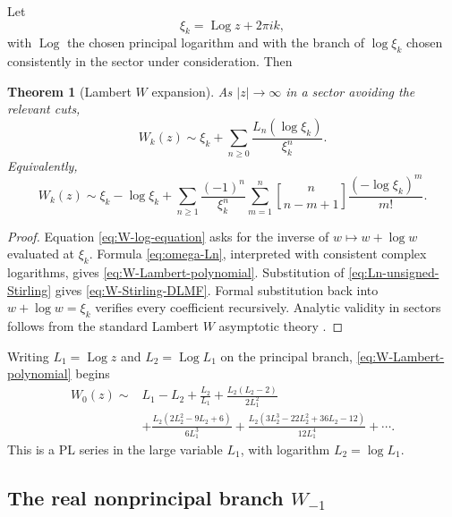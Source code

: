 \documentclass[11pt,oneside]{article}
\numberwithin{equation}{section}
\newtheorem{theorem}{Theorem}[section]
\theoremstyle{definition}
\newcommand{\as}{\sim}
\newcommand{\StirlingFirst}[2]{\genfrac{[}{]}{0pt}{}{#1}{#2}}
\newcommand{\Log}{\operatorname{Log}}
\begin{document}
Let
\begin{equation}\label{eq:xi-k}
  \xi_k=\Log z+2\pi i k,
\end{equation}
with \(\Log\) the chosen principal logarithm and with the branch of
\(\log\xi_k\) chosen consistently in the sector under consideration.  Then
\begin{theorem}[Lambert \(W\) expansion]\label{thm:W-expansion}
As \(|z|\to\infty\) in a sector avoiding the relevant cuts,
\begin{equation}\label{eq:W-Lambert-polynomial}
\boxed{
  W_k(z)\as \xi_k+
  \sum_{n\ge0}\frac{L_n(\log\xi_k)}{\xi_k^n}.
}
\end{equation}
Equivalently,
\begin{equation}\label{eq:W-Stirling-DLMF}
  W_k(z)\as\xi_k-\log\xi_k
  +\sum_{n\ge1}\frac{(-1)^n}{\xi_k^n}
    \sum_{m=1}^n
      \StirlingFirst{n}{n-m+1}
      \frac{(-\log\xi_k)^m}{m!}.
\end{equation}
\end{theorem}

\begin{proof}
Equation \eqref{eq:W-log-equation} asks for the inverse of
\(w\mapsto w+\log w\) evaluated at \(\xi_k\).  Formula
\eqref{eq:omega-Ln}, interpreted with consistent complex logarithms, gives
\eqref{eq:W-Lambert-polynomial}.  Substitution of
\eqref{eq:Ln-unsigned-Stirling} gives
\eqref{eq:W-Stirling-DLMF}.  Formal substitution back into
\(w+\log w=\xi_k\) verifies every coefficient recursively.  Analytic validity in
sectors follows from the standard Lambert \(W\) asymptotic theory
\cite{Corless1996,DLMFLambert}.
\end{proof}

Writing \(L_1=\Log z\) and \(L_2=\Log L_1\) on the principal branch,
\eqref{eq:W-Lambert-polynomial} begins
\begin{align}
 W_0(z)\as{}&L_1-L_2+\frac{L_2}{L_1}
 +\frac{L_2(L_2-2)}{2L_1^2}\nonumber\\
 &+\frac{L_2(2L_2^2-9L_2+6)}{6L_1^3}
 +\frac{L_2(3L_2^3-22L_2^2+36L_2-12)}{12L_1^4}
 +\cdots.
 \label{eq:W-standard-expanded}
\end{align}
This is a PL series in the large variable \(L_1\), with logarithm
\(L_2=\log L_1\).

\subsection{The real nonprincipal branch \(W_{-1}\)}
\end{document}
